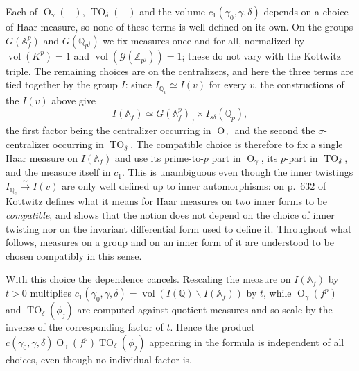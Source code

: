 \documentclass[11pt,a4paper]{article}
\theoremstyle{definition}
\theoremstyle{plain}
\theoremstyle{remark}
\theoremstyle{plain}
\DeclareMathOperator{\vol}{vol}
\DeclareMathOperator{\Or}{O}
\DeclareMathOperator{\TO}{TO}
\begin{document}
Each of $\Or_{\gamma}(-)$, $\TO_{\delta}(-)$ and the volume $c_1(\gamma_0, \gamma, \delta)$
depends on a choice of Haar measure, so none of these terms is well defined on its own. On
the groups $G(\mathbb{A}_f^p)$ and $G(\mathbb{Q}_{p^j})$ we fix measures once and for all,
normalized by $\vol(K^p) = 1$ and $\vol(\mathcal{G}(\mathbb{Z}_{p^j})) = 1$; these do not
vary with the Kottwitz triple. The remaining choices are on the centralizers, and here the
three terms are tied together by the group $I$: since $I_{\mathbb{Q}_v} \simeq I(v)$ for
every $v$, the constructions of the $I(v)$ above give
$$I(\mathbb{A}_f) \simeq G(\mathbb{A}_f^p)_{\gamma} \times I_{s\delta}(\mathbb{Q}_p),$$
the first factor being the centralizer occurring in $\Or_{\gamma}$ and the second the
$\sigma$-centralizer occurring in $\TO_{\delta}$. The compatible choice is therefore to fix
a single Haar measure on $I(\mathbb{A}_f)$ and use its prime-to-$p$ part in $\Or_{\gamma}$,
its $p$-part in $\TO_{\delta}$, and the measure itself in $c_1$. This is unambiguous even
though the inner twistings $I_{\mathbb{Q}_v} \xrightarrow{\sim} I(v)$ are only well defined
up to inner automorphisms: on p.\ 632 of \cite{MR942522} Kottwitz defines what it means for
Haar measures on two inner forms to be \textit{compatible}, and shows that the notion does
not depend on the choice of inner twisting nor on the invariant differential form used to
define it. Throughout what follows, measures on a group and on an inner form of it are
understood to be chosen compatibly in this sense.

With this choice the dependence cancels. Rescaling the measure on $I(\mathbb{A}_f)$ by
$t > 0$ multiplies $c_1(\gamma_0,\gamma,\delta) = \vol(I(\mathbb{Q}) \backslash
I(\mathbb{A}_f))$ by $t$, while $\Or_{\gamma}(f^p)$ and $\TO_{\delta}(\phi_j)$ are computed
against quotient measures and so scale by the inverse of the corresponding factor of $t$.
Hence the product $c(\gamma_0, \gamma, \delta) \Or_{\gamma}(f^p) \TO_{\delta}(\phi_j)$
appearing in the formula is independent of all choices, even though no individual factor
is.
\end{document}
